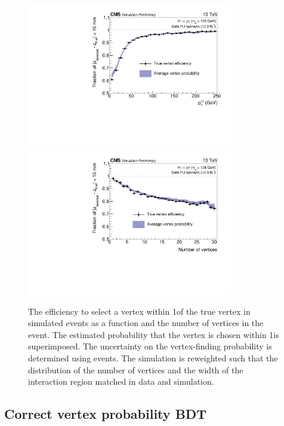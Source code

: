 \begin{figure}[h]
\centering
\includegraphics[width=0.8\textwidth]{recoFigures/Pt2016PU125BSReweighted12.pdf}\\
\includegraphics[width=0.8\textwidth]{recoFigures/Nvtx2016PU125BSReweighted12.pdf}
\caption{The efficiency to select a vertex within 1\cm of the true vertex in simulated \Hgg events as a function \pT and the number of vertices in the event. The estimated probability that the vertex is chosen within 1\cm is superimposed. The uncertainty on the vertex-finding probability is determined using \Zmumu events. The simulation is reweighted such that the distribution of the number of vertices and the width of the interaction region matched in data and simulation. }
\label{fig:reco:vtxidbdt_eff}
\end{figure}

\subsection{Correct vertex probability BDT}
\label{reco:sec:vtx_prob}


